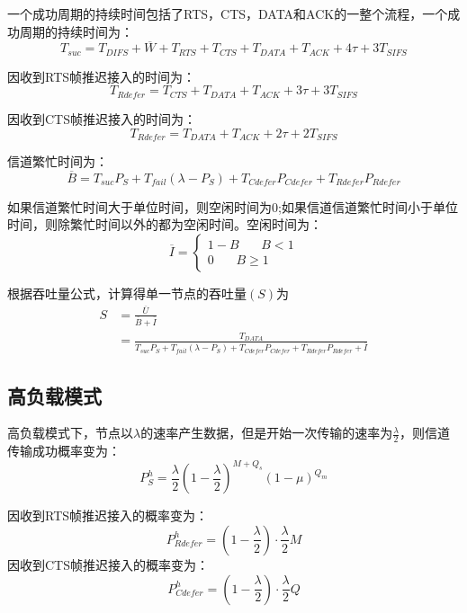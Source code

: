一个成功周期的持续时间包括了RTS，CTS，DATA和ACK的一整个流程，一个成功周期的持续时间为：
\begin{equation}
T_{suc}=T_{DIFS}+\overline W+T_{RTS}+T_{CTS}+T_{DATA}+T_{ACK}+4\tau+3T_{SIFS}
\end{equation}

因收到RTS帧推迟接入的时间为：
\begin{equation}
T_{Rdefer}=T_{CTS}+T_{DATA}+T_{ACK}+3\tau+3T_{SIFS}
\end{equation}

因收到CTS帧推迟接入的时间为：
\begin{equation}
T_{Rdefer}=T_{DATA}+T_{ACK}+2\tau+2T_{SIFS}
\end{equation}

信道繁忙时间为：
\begin{equation}
\overline B=T_{suc}P_S+T_{fail}(\lambda-P_S )+ T_{Cdefer}P_{Cdefer}+T_{Rdefer}P_{Rdefer}
\end{equation}

如果信道繁忙时间大于单位时间，则空闲时间为0;如果信道信道繁忙时间小于单位时间，则除繁忙时间以外的都为空闲时间。空闲时间为：
\begin{equation}
\overline I=\left\{
\begin{aligned}
1-B \ \ \ \ \ \ \ \ B<1\\
0\ \ \ \ \ \ \ \    B\ge 1
\end{aligned}
\right.
\end{equation}

根据吞吐量公式，计算得单一节点的吞吐量$(S)$为
\begin{equation}
\begin{aligned}
S&=\frac{\overline U}{\overline B+\overline I}\\&=\frac{T_{DATA}}{ T_{suc}P_S+T_{fail}(\lambda-P_S )+ T_{Cdefer}P_{Cdefer}+T_{Rdefer}P_{Rdefer}+\overline I}
\end{aligned}
\end{equation}

\subsection {高负载模式}
高负载模式下，节点以$\lambda$的速率产生数据，但是开始一次传输的速率为$\frac{\lambda}{2}$，则信道传输成功概率变为：
\begin{equation}
P_S^h=\frac{\lambda}{2}(1-\frac{\lambda}{2})^{M+Q_s}(1-\mu)^{Q_m}
\end{equation}

因收到RTS帧推迟接入的概率变为：
\begin{equation}
P_{Rdefer}^h=(1-\frac{\lambda}{2})\cdot\frac{\lambda}{2} M
\end{equation}
因收到CTS帧推迟接入的概率变为：
\begin{equation}
P_{Cdefer}^h=(1-\frac{\lambda}{2})\cdot\frac{\lambda}{2} Q
\end{equation}

